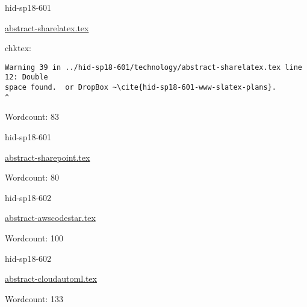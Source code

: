 

\begin{IU}

hid-sp18-601

\href{https://github.com/cloudmesh-community/hid-sp18-601/blob/master//technology/abstract-sharelatex.tex}{abstract-sharelatex.tex}

 
chktex:
\begin{tiny}
\begin{verbatim}
Warning 39 in ../hid-sp18-601/technology/abstract-sharelatex.tex line 12: Double
space found.  or DropBox ~\cite{hid-sp18-601-www-slatex-plans}.             ^
\end{verbatim}
\end{tiny}

Wordcount: 83

\end{IU}



\begin{IU}

hid-sp18-601

\href{https://github.com/cloudmesh-community/hid-sp18-601/blob/master//technology/abstract-sharepoint.tex}{abstract-sharepoint.tex}

 

Wordcount: 80

\end{IU}



\begin{IU}

hid-sp18-602

\href{https://github.com/cloudmesh-community/hid-sp18-602/blob/master//technology/abstract-awscodestar.tex}{abstract-awscodestar.tex}

 

Wordcount: 100

\end{IU}



\begin{IU}

hid-sp18-602

\href{https://github.com/cloudmesh-community/hid-sp18-602/blob/master//technology/abstract-cloudautoml.tex}{abstract-cloudautoml.tex}

 

Wordcount: 133

\end{IU}

